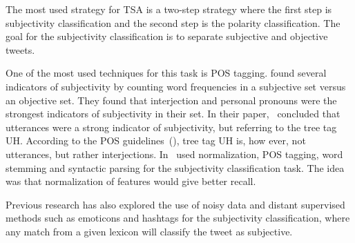 The most used strategy for TSA is a two-step strategy where the first step is subjectivity classification and the second step is the polarity classification. The goal for the subjectivity classification is to separate subjective and objective tweets.

One of the most used techniques for this task is POS tagging. \cite{article:pak} found several indicators of subjectivity by counting word frequencies in a subjective set versus an objective set. They found that interjection and personal pronouns were the strongest indicators of subjectivity in their set. In their paper,~\cite{article:pak} concluded that utterances were a strong indicator of subjectivity, but referring to the tree tag UH. According to the POS guidelines~(\cite{treebank}), tree tag UH is, how ever, not utterances, but rather interjections. In~\cite{article:jiang} used normalization, POS tagging, word stemming and syntactic parsing for the subjectivity classification task. The idea was that normalization of features would give better recall.

Previous research has also explored the use of noisy data and distant supervised methods such as emoticons and hashtags for the subjectivity classification, where any match from a given lexicon will classify the tweet as subjective.
